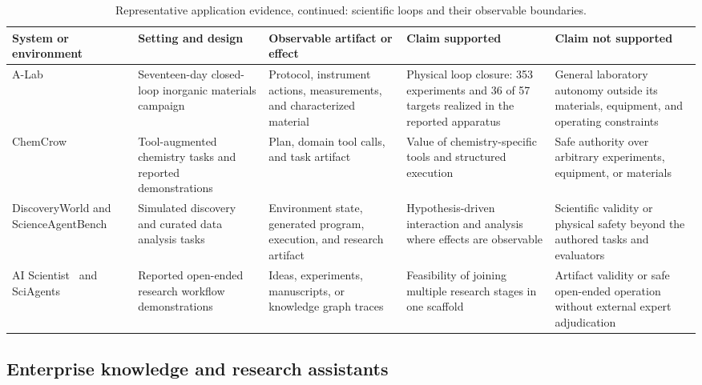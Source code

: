 \begin{table}[!htbp]
\centering
\caption{Representative application evidence, continued: scientific loops and their observable boundaries.}
\label{tab:application-evidence-science}
\small
\surveytableformat
\begin{tabularx}{\textwidth}{L{2.35cm}L{2.65cm}L{3.05cm}L{3.15cm}Y}
\toprule
{}\textbf{System or environment} & \textbf{Setting and design} & \textbf{Observable artifact or effect} & \textbf{Claim supported} & \textbf{Claim not supported} \\
\midrule
A-Lab~\cite{szymanski2023alab} & Seventeen-day closed-loop inorganic materials campaign & Protocol, instrument actions, measurements, and characterized material & Physical loop closure: 353 experiments and 36 of 57 targets realized in the reported apparatus & General laboratory autonomy outside its materials, equipment, and operating constraints \\
ChemCrow~\cite{bran2024chemcrow} & Tool-augmented chemistry tasks and reported demonstrations & Plan, domain tool calls, and task artifact & Value of chemistry-specific tools and structured execution & Safe authority over arbitrary experiments, equipment, or materials \\
Discovery\-World\newline\cite{jansen2024discoveryworld} and ScienceAgent\-Bench\newline\cite{chen2025scienceagentbench} & Simulated discovery and curated data analysis tasks & Environment state, generated program, execution, and research artifact & Hypothesis-driven interaction and analysis where effects are observable & Scientific validity or physical safety beyond the authored tasks and evaluators \\
AI Scientist~\cite{lu2024aiscientist} and SciAgents~\cite{ghafarollahi2024sciagents} & Reported open-ended research workflow demonstrations & Ideas, experiments, manuscripts, or knowledge graph traces & Feasibility of joining multiple research stages in one scaffold & Artifact validity or safe open-ended operation without external expert adjudication \\
\bottomrule
\end{tabularx}
\end{table}

\subsection{Enterprise knowledge and research assistants}

